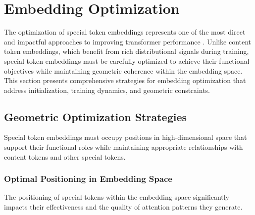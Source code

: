 
\section{Embedding Optimization}

The optimization of special token embeddings represents one of the most direct and impactful approaches to improving transformer performance \citep{reif2019visualizing, ethayarajh2019contextual}. Unlike content token embeddings, which benefit from rich distributional signals during training, special token embeddings must be carefully optimized to achieve their functional objectives while maintaining geometric coherence within the embedding space. This section presents comprehensive strategies for embedding optimization that address initialization, training dynamics, and geometric constraints.

\subsection{Geometric Optimization Strategies}

Special token embeddings must occupy positions in high-dimensional space that support their functional roles while maintaining appropriate relationships with content tokens and other special tokens.
\begin{comment}
Feedback: Before linking to the code, it's crucial to explain the core intuition. For example: "The geometry of the embedding space matters. For a [CLS] token to effectively summarize a sequence, its embedding should ideally be 'central' to the content tokens it's summarizing. For different special tokens (e.g., [TASK_A] and [TASK_B]) to be clearly distinguishable, their embeddings should be far apart, or 'orthogonal.' Geometric optimization involves adding terms to the loss function that explicitly encourage these desired spatial relationships, rather than hoping they emerge on their own."
\end{comment}

\subsubsection{Optimal Positioning in Embedding Space}

The positioning of special tokens within the embedding space significantly impacts their effectiveness and the quality of attention patterns they generate.

